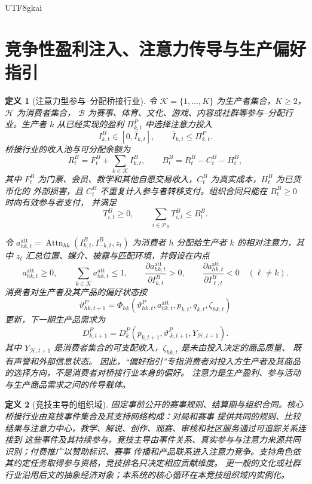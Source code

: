 \documentclass[12pt,a4paper,openany]{report}
\newtheorem{definition}{定义}[chapter]
\newcommand{\Part}{\mathcal P}
\begin{document}
\begin{CJK*}{UTF8}{gkai}
\section{竞争性盈利注入、注意力传导与生产偏好指引}

\begin{definition}[注意力型参与--分配桥接行业]
令 \(\mathcal K=\{1,\ldots,K\}\) 为生产者集合，\(K\ge2\)，\(\mathcal H\) 为消费者集合，
\(\mathcal B\) 为赛事、体育、文化、游戏、内容或社群等参与--分配行业。生产者 \(k\) 从已经实现的盈利
\(\Pi_{k,t}^P\) 中选择注意力投入
\[
  I_{k,t}^B\in[0,\bar I_{k,t}],
  \qquad
  \bar I_{k,t}\le\Pi_{k,t}^P.
\]
桥接行业的收入池与可分配余额为
\[
  R_t^B=F_t^B+\sum_{k\in\mathcal K}I_{k,t}^B,
  \qquad
  B_t^B=R_t^B-C_t^B-H_t^B,
\]
其中 \(F_t^B\) 为门票、会员、教学和其他自愿交易收入，\(C_t^B\) 为真实成本，\(H_t^B\) 为已货币化的
外部损害，且 \(C_t^B\) 不重复计入参与者转移支付。组织合同只能在 \(B_t^B\ge0\) 时向有效参与者支付，
并满足
\[
  T_{i,t}^B\ge0,
  \qquad
  \sum_{i\in\Part_B}T_{i,t}^B\le B_t^B.
\]

令 \(a_{hk,t}^{\mathrm{att}}=\operatorname{Attn}_{hk}(I_{k,t}^B,I_{-k,t}^B,z_t)\) 为消费者 \(h\)
分配给生产者 \(k\) 的相对注意力，其中 \(z_t\) 汇总位置、媒介、披露与匹配环境，并假设在内点
\[
  a_{hk,t}^{\mathrm{att}}\ge0,
  \qquad
  \sum_{k\in\mathcal K}a_{hk,t}^{\mathrm{att}}\le1,
  \qquad
  \frac{\partial a_{hk,t}^{\mathrm{att}}}{\partial I_{k,t}^B}>0,
  \qquad
  \frac{\partial a_{hk,t}^{\mathrm{att}}}{\partial I_{\ell,t}^B}<0
  \quad(\ell\ne k).
\]
消费者对生产者及其产品的偏好状态按
\[
  \vartheta_{hk,t+1}^P
  =\Phi_{hk}(\vartheta_{hk,t}^P,a_{hk,t}^{\mathrm{att}},p_{k,t},q_{k,t},\zeta_{hk,t})
\]
更新，下一期生产品需求为
\[
  D_{k,t+1}^P
  =D_k^P(p_{k,t+1},\vartheta_{\cdot k,t+1}^P,Y_{\mathcal H,t+1}).
\]
其中 \(Y_{\mathcal H,t+1}\) 是消费者集合的可支配收入，\(\zeta_{hk,t}\) 是未由投入决定的商品质量、
既有声誉和外部信息状态。
因此，“偏好指引”专指消费者对投入方生产者及其商品的选择方向，不是消费者对桥接行业本身的偏好。
注意力是生产盈利、参与活动与生产商品需求之间的传导载体。
\end{definition}

\begin{definition}[竞技主导的组织域]
\label{def:competition-led-domain}
固定事前公开的赛事规则、结算期与组织合同。核心桥接行业由竞技事件集合及其支持网络构成：对局和赛事
提供共同的规则、比较结果与注意力中心，教学、解说、创作、观赛、审核和社区服务通过可追踪关系连接到
这些事件及其持续参与。竞技主导由事件关系、真实参与与注意力来源共同识别；付费推广以赞助标识、赛事
传播和产品联系进入注意力竞争。支持角色依其约定任务取得参与资格，竞技排名只决定相应贡献维度。
更一般的文化或社群行业沿用后文的抽象经济对象；本系统的核心循环在本竞技组织域内实例化。
\end{definition}


\end{CJK*}
\end{document}
